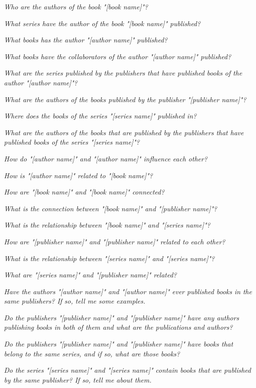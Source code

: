 \squishlist
\item \textit{Who are the authors of the book "[book name]"?}
\item \textit{What series have the author of the book "[book name]" published?}
\item \textit{What books has the author "[author name]" published?}
\item \textit{What books have the collaborators of the author "[author name]" published?}
\item \textit{What are the series published by the publishers that have published books of the author "[author name]"?}
\item \textit{What are the authors of the books published by the publisher "[publisher name]"?}
\item \textit{Where does the books of the series "[series name]" published in?}
\item \textit{What are the authors of the books that are published by the publishers that have published books of the series "[series name]"?}
\squishend


\squishlist
\item \textit{How do "[author name]" and "[author name]" influence each other?}
\item \textit{How is "[author name]" related to "[book name]"?}
\item \textit{How are "[book name]" and "[book name]" connected?}
\item \textit{What is the connection between "[book name]" and "[publisher name]"?}
\item \textit{What is the relationship between "[book name]" and "[series name]"?}
\item \textit{How are "[publisher name]" and "[publisher name]" related to each other?}
\item \textit{What is the relationship between "[series name]" and "[series name]"?}
\item \textit{What are "[series name]" and "[publisher name]" related?}
\squishend


\squishlist
\item \textit{Have the authors "[author name]" and "[author name]" ever published books in the same publishers? If so, tell me some examples.}
\item \textit{Do the publishers "[publisher name]" and "[publisher name]" have any authors publishing books in both of them and what are the publications and authors?}
\item \textit{Do the publishers "[publisher name]" and "[publisher name]" have books that belong to the same series, and if so, what are those books?}
\item \textit{Do the series "[series name]" and "[series name]" contain books that are published by the same publisher? If so, tell me about them.}
\squishend

